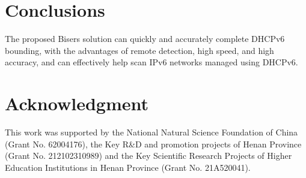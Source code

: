 \documentclass[conference]{IEEEtran}
\begin{document}
\section{Conclusions}

The proposed Bisers solution can quickly and accurately complete
DHCPv6 bounding, with the advantages of remote detection, high speed,
and high accuracy, and can effectively help scan IPv6 networks managed
using DHCPv6.

\section*{Acknowledgment}

This work was supported by the National Natural Science Foundation of
China (Grant No. 62004176), the Key R\&D and promotion projects of
Henan Province (Grant No. 212102310989) and the Key Scientific
Research Projects of Higher Education Institutions in Henan Province
(Grant No. 21A520041).



\end{document}
